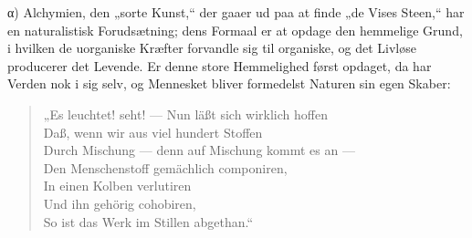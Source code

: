 \documentclass[12pt]{book}
\newcommand{\opage}[1]{\marginnote{\footnotesize\textit{[#1]}}}
\begin{document}
α) Alchymien, den „sorte Kunst,“ der gaaer ud paa at finde „de Vises Steen,“ har en
naturalistisk Forudsætning; dens Formaal er at opdage den hemmelige Grund, i hvilken
\opage{220} de uorganiske Kræfter forvandle sig til organiske, og det Livløse producerer det Levende.
Er denne store Hemmelighed først opdaget, da har Verden nok i sig selv, og Mennesket bliver
formedelst Naturen sin egen Skaber:
%
\begin{verse}
\small
„Es leuchtet! seht! --- Nun läßt sich wirklich hoffen\\
Daß, wenn wir aus viel hundert Stoffen\\
Durch Mischung --- denn auf Mischung kommt es an ---\\
Den Menschenstoff gemächlich componiren,\\
In einen Kolben verlutiren\\
Und ihn gehörig cohobiren,\\
So ist das Werk im Stillen abgethan.“
\end{verse}
\end{document}
